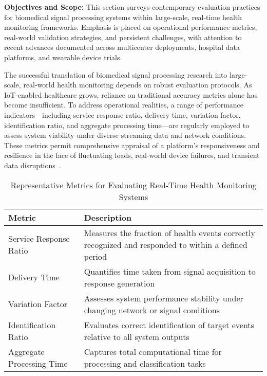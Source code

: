 \documentclass[sigconf]{acmart}
\begin{document}
\textbf{Objectives and Scope:} This section surveys contemporary evaluation practices for biomedical signal processing systems within large-scale, real-time health monitoring frameworks. Emphasis is placed on operational performance metrics, real-world validation strategies, and persistent challenges, with attention to recent advances documented across multicenter deployments, hospital data platforms, and wearable device trials.

The successful translation of biomedical signal processing research into large-scale, real-world health monitoring depends on robust evaluation protocols. As IoT-enabled healthcare grows, reliance on traditional accuracy metrics alone has become insufficient. To address operational realities, a range of performance indicators—including service response ratio, delivery time, variation factor, identification ratio, and aggregate processing time—are regularly employed to assess system viability under diverse streaming data and network conditions. These metrics permit comprehensive appraisal of a platform’s responsiveness and resilience in the face of fluctuating loads, real-world device failures, and transient data disruptions~\cite{ref106}.

\begin{table*}[htbp]
\centering
\caption{Representative Metrics for Evaluating Real-Time Health Monitoring Systems}
\label{tab:eval_metrics}
\begin{adjustbox}{max width=\textwidth}
\begin{tabular}{ll}
\toprule
\textbf{Metric} & \textbf{Description} \\
\midrule
Service Response Ratio & Measures the fraction of health events correctly recognized and responded to within a defined period \\
Delivery Time & Quantifies time taken from signal acquisition to response generation \\
Variation Factor & Assesses system performance stability under changing network or signal conditions \\
Identification Ratio & Evaluates correct identification of target events relative to all system outputs \\
Aggregate Processing Time & Captures total computational time for processing and classification tasks \\
\bottomrule
\end{tabular}
\end{adjustbox}
\end{table*}
\end{document}
